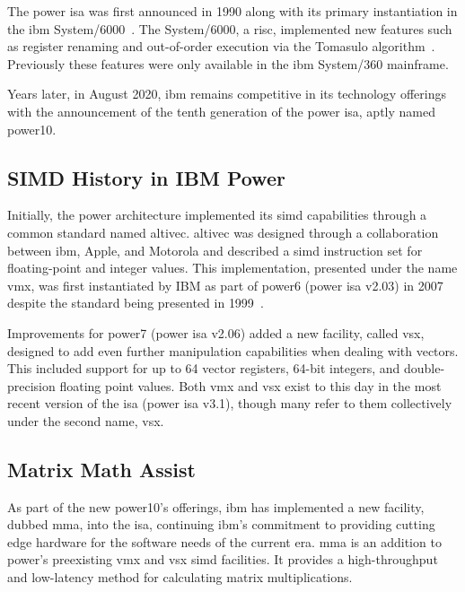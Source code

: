 \documentclass[\main/thesis.tex]{subfiles}
\begin{document}
The \gls{power} \gls{isa} was first announced in 1990 along with its primary instantiation in the \gls{ibm} System/6000~\autocite{montoye1990design}.
The System/6000, a \gls{risc}, implemented new features such as register renaming and out-of-order execution via the Tomasulo algorithm~\autocite{tomasulo1967efficient}.
Previously these features were only available in the \gls{ibm} System/360 mainframe.

Years later, in August 2020, \gls{ibm} remains competitive in its technology offerings with the announcement of the tenth generation of the \gls{power} \gls{isa}, aptly named \gls{power10}.

\subsection{SIMD History in IBM Power}
Initially, the \gls{power} architecture implemented its \gls{simd} capabilities through a common standard named \gls{altivec}.
\Gls{altivec} was designed through a collaboration between \gls{ibm}, Apple, and Motorola and described a \gls{simd} instruction set for floating-point and integer values.
This implementation, presented under the name \gls{vmx}, was first instantiated by IBM as part of \gls{power}6 (\gls{power} \gls{isa} v2.03) in 2007~\autocite{eisen2007ibm} despite the standard being presented in 1999~\autocite{tyler1999altivec}.

Improvements for \gls{power}7 (\gls{power} \gls{isa} v2.06) added a new facility, called \gls{vsx}, designed to add even further manipulation capabilities when dealing with vectors.
This included support for up to 64 vector registers, 64-bit integers, and double-precision floating point values.
Both \gls{vmx} and \gls{vsx} exist to this day in the most recent version of the \gls{isa} (\gls{power} \gls{isa} v3.1), though many refer to them collectively under the second name, \gls{vsx}.

\subsection{Matrix Math Assist}
\label{sec:mmaintro}
As part of the new \gls{power10}'s offerings, \gls{ibm} has implemented a new facility, dubbed \gls{mma}, into the \gls{isa}, continuing \gls{ibm}'s commitment to providing cutting edge hardware for the software needs of the current era.
\gls{mma} is an addition to \gls{power}'s preexisting \gls{vmx} and \gls{vsx} \gls{simd} facilities.
It provides a high-throughput and low-latency method for calculating matrix multiplications.
\end{document}
